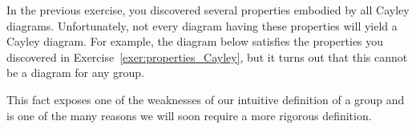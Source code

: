In the previous exercise, you discovered several properties embodied by all Cayley diagrams. Unfortunately, not every diagram having these properties will yield a Cayley diagram.  For example, the diagram below satisfies the properties you discovered in Exercise~\ref{exer:properties_Cayley}, but it turns out that this cannot be a diagram for any group.


This fact exposes one of the weaknesses of our intuitive definition of a group and is one of the many reasons we will soon require a more rigorous definition.